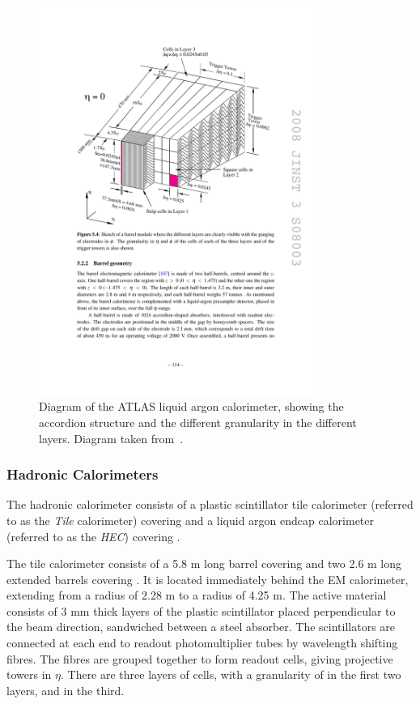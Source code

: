\begin{figure}[h]
\centering
\includegraphics[width=0.8\textwidth]{lar-diagram}
\caption{Diagram of the ATLAS liquid argon calorimeter, showing the accordion
structure and the different granularity in the different layers. Diagram taken
from~\cite{1748-0221-3-08-S08003}.}
\label{fig:lar-diagram}
\end{figure}

\subsubsection{Hadronic Calorimeters}

The hadronic calorimeter consists of a plastic scintillator tile calorimeter 
(referred to as the {\it Tile} calorimeter) covering  and a liquid
argon endcap calorimeter (referred to as the {\it HEC}) covering
. 

The tile calorimeter consists of a 5.8 m long barrel covering
 and two 2.6 m long extended barrels covering
.
It is located immediately behind the EM calorimeter, extending from a radius of
2.28 m to a radius of 4.25 m. The active material consists of 3 mm thick layers of the plastic scintillator 
placed perpendicular to the beam direction, sandwiched between a steel absorber.
The scintillators are connected at each end to
readout photomultiplier tubes by wavelength shifting fibres. The fibres are grouped
together to form readout cells, giving projective towers in $\eta$. There are
three layers of cells, with a granularity of  in the
first two layers, and  in the third.

